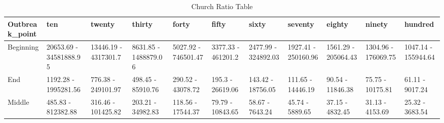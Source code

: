 \begin{table}

\caption{Church Ratio Table}
\centering
\begin{tabular}[t]{lllllllllll}
\toprule
Outbreak\_point & ten & twenty & thirty & forty & fifty & sixty & seventy & eighty & ninety & hundred\\
\midrule
Beginning & 20653.69 - 34581888.95 & 13446.19 - 4317301.7 & 8631.85 - 1488879.06 & 5027.92 - 746501.47 & 3377.33 - 461201.2 & 2477.99 - 324892.03 & 1927.41 - 250160.96 & 1561.29 - 205064.43 & 1304.96 - 176069.75 & 1047.14 - 155944.64\\
End & 1192.28 - 1995281.56 & 776.38 - 249101.97 & 498.45 - 85910.76 & 290.52 - 43078.72 & 195.3 - 26619.06 & 143.42 - 18756.05 & 111.65 - 14446.19 & 90.54 - 11846.38 & 75.75 - 10175.81 & 61.11 - 9017.24\\
Middle & 485.83 - 812382.88 & 316.46 - 101425.82 & 203.21 - 34982.83 & 118.56 - 17544.37 & 79.79 - 10843.65 & 58.67 - 7643.24 & 45.74 - 5889.65 & 37.15 - 4832.45 & 31.13 - 4153.69 & 25.32 - 3683.54\\
\bottomrule
\end{tabular}
\end{table}
